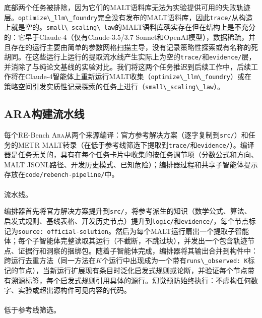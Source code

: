 \documentclass[
]{article}
\makeatletter
\let\oldparagraph\paragraph
\renewcommand{\paragraph}{
    \@ifstar
      \xxxParagraphStar
      \xxxParagraphNoStar
  }
\newcommand{\xxxParagraphStar}[1]{\oldparagraph*{#1}\mbox{}}
\newcommand{\xxxParagraphNoStar}[1]{\oldparagraph{#1}\mbox{}}
\newcommand{\passthrough}[1]{#1}
\theoremstyle{definition}
\newcommand{\ara}{\textsc{Ara}}
\makeatother
\begin{document}
底部两个任务被排除，因为它们的MALT语料库无法为实验提供可用的失败轨迹层。\passthrough{\lstinline!optimize\_llm\_foundry!}完全没有发布的MALT语料库，因此\passthrough{\lstinline!trace/!}从构造上就是空的。\passthrough{\lstinline!small\_scaling\_law!}的MALT语料库确实存在但在结构上是不充分的：它早于Claude-4（仅有Claude-3.5/3.7
Sonnet和OpenAI模型），数据稀疏，并且存在的运行主要由简单的参数网格扫描主导，没有记录策略性探索或有名称的死胡同。在这些运行上运行的提取流水线产生实际上为空的\passthrough{\lstinline!trace/!}和\passthrough{\lstinline!evidence/!}层，并消除了与纯论文基线的实验对比。我们将这两个任务推迟到后续工作中，后续工作将在Claude-4智能体上重新运行MALT收集（\passthrough{\lstinline!optimize\_llm\_foundry!}）或在策略空间引发实质性记录探索的任务上进行（\passthrough{\lstinline!small\_scaling\_law!}）。

\subsection{ARA构建流水线}\label{sec-app-extension-pipeline}

每个RE-Bench
\ara{}从两个来源编译：官方参考解决方案（逐字复制到\passthrough{\lstinline!src/!}）和任务的METR
MALT转录（在低于参考线筛选下提取到\passthrough{\lstinline!trace/!}和\passthrough{\lstinline!evidence/!}）。编译器是任务无关的，具有在每个任务卡片中收集的按任务调节项（分数公式和方向、MALT
JSONL路径、开发历史模式、已知危险）；编排器过程和共享子智能体提示存放在\passthrough{\lstinline!code/rebench-pipeline/!}中。

\paragraph{流水线。}\label{ux6d41ux6c34ux7ebf}

编排器首先将官方解决方案提升到\passthrough{\lstinline!src/!}，将参考派生的知识（数学公式、算法、启发式规则、基线表格、开发历史节点）提升到\passthrough{\lstinline!logic/!}和\passthrough{\lstinline!evidence/!}，每个节点标记为\passthrough{\lstinline!source: official-solution!}。然后为每个MALT运行扇出一个提取子智能体；每个子智能体完整读取其运行（不截断，不跳过块），并发出一个包含轨迹节点、证据行和洞察的捆绑包。随着子智能体完成，编排器将其输出合并到构件中：跨运行去重方法（同一方法在\(K\)个运行中出现成为一个带有\passthrough{\lstinline!runs\_observed: K!}标记的节点），当新运行扩展现有条目时泛化启发式规则或论断，并验证每个节点带有溯源标签，每个启发式规则引用具体的源行。幻觉预防始终执行：不虚构任何数字、实验或超出源构件可见内容的代码。

\paragraph{低于参考线筛选。}\label{ux4f4eux4e8eux53c2ux8003ux7ebfux7b5bux9009}
\end{document}
